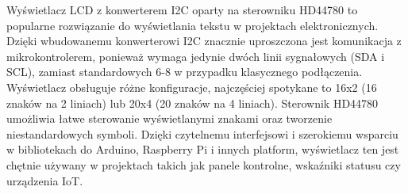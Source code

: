     Wyświetlacz LCD z konwerterem I2C oparty na sterowniku HD44780 to popularne rozwiązanie do wyświetlania tekstu w projektach elektronicznych. Dzięki wbudowanemu konwerterowi I2C znacznie uproszczona jest komunikacja z mikrokontrolerem, ponieważ wymaga jedynie dwóch linii sygnałowych (SDA i SCL), zamiast standardowych 6-8 w przypadku klasycznego podłączenia. Wyświetlacz obsługuje różne konfiguracje, najczęściej spotykane to 16x2 (16 znaków na 2 liniach) lub 20x4 (20 znaków na 4 liniach). Sterownik HD44780 umożliwia łatwe sterowanie wyświetlanymi znakami oraz tworzenie niestandardowych symboli. Dzięki czytelnemu interfejsowi i szerokiemu wsparciu w bibliotekach do Arduino, Raspberry Pi i innych platform, wyświetlacz ten jest chętnie używany w projektach takich jak panele kontrolne, wskaźniki statusu czy urządzenia IoT.